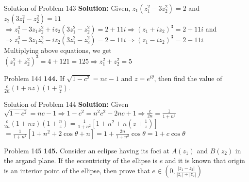 \documentclass[aspectratio=169,8pt]{beamer}
\begin{document}
\begin{frame}{Solution of Problem 143}
  \textbf{Solution:} Given, $z_1(z_1^2 - 3z_2^2) = 2$ and $z_2(3z_1^2 - z_2^2) = 11$\\
  \vspace*{0.2cm}
  $\Rightarrow z_1^3 - 3z_1z_2^2 + iz_2(3z_1^2 - z_2^2) = 2 + 11i \Rightarrow (z_1 + iz_2)^3 = 2 + 11i$ and\\
  \vspace*{0.2cm}
  $\Rightarrow z_1^3 - 3z_1z_2^2 - iz_2(3z_1^2 - z_2^2) = 2 - 11i \Rightarrow (z_1 - iz_2)^3 = 2 - 11i$\\
  \vspace*{0.2cm}
  Multiplying above equations, we get\\
  \vspace*{0.2cm}
  $(z_1^2 + z_2^2)^3 = 4 + 121 = 125 \Rightarrow z_1^2 + z_2^2 = 5$
\end{frame}
\begin{frame}{Problem 144}
  \textbf{144.} If $\sqrt{1 - c^2} = nc - 1$ and $z = e^{i\theta}$, then find the value of $\frac{c}{2n}(1 + nz)\left(1 + \frac{n}{z}\right)$.
\end{frame}
\begin{frame}{Solution of Problem 144}
  \textbf{Solution:} Given $\sqrt{1 - c^2} = nc - 1 \Rightarrow 1 - c^2 = n^2c^2 - 2nc + 1 \Rightarrow \frac{c}{2n} = \frac{1}{1 +
    n^2}$\\
  \vspace*{0.2cm}
  $\frac{c}{2n}(1 + nz)\left(1 + \frac{n}{z}\right) = \frac{1}{1 + n^2}\left[1 + n^2 + n\left(z + \frac{1}{z}\right)\right]$\\
  \vspace*{0.2cm}
  $= \frac{1}{1 + n^2}\left[1 + n^2 + 2\cos\theta + n\right] = 1 + \frac{2n}{1 + n^2}\cos\theta = 1 + c\cos\theta$
\end{frame}
\begin{frame}{Problem 145}
  \textbf{145.} Consider an eclipse having its foci at $A(z_1)$ and $B(z_2)$ in the argand plane. If the eccentricity of the
  ellipse is $e$ and it is known that origin is an interior point of the ellipse, then prove that $e\in \left(0, \frac{|z_1 -
    z_2|}{|z_1| + |z_2|}\right)$
\end{frame}
\end{document}
